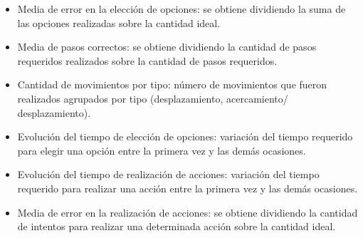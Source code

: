 \begin{itemize}
    
\item Media de error en la elección de opciones: se obtiene dividiendo la suma
    de las opciones realizadas sobre la cantidad ideal. 
    
\item Media de pasos correctos: se obtiene dividiendo la cantidad de pasos
    requeridos realizados sobre la cantidad de pasos requeridos. 
    
\item Cantidad de movimientos por tipo: número de movimientos que fueron
    realizados agrupados por tipo (desplazamiento, acercamiento/
    desplazamiento).
    
\item Evolución del tiempo de elección de opciones: variación del tiempo
    requerido para elegir una opción entre la primera vez y las demás ocasiones.
    
\item Evolución del tiempo de realización de acciones: variación del tiempo
    requerido para realizar una acción entre la primera vez y las demás
    ocasiones.
    
\item Media de error en la realización de acciones: se obtiene dividiendo la
    cantidad de intentos para realizar una determinada acción sobre la cantidad
    ideal.

\end{itemize}

